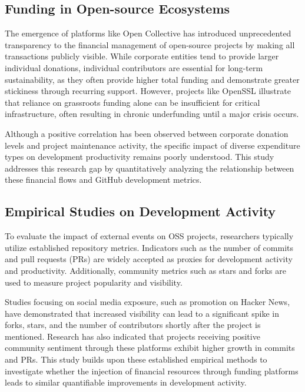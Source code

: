 \documentclass[11pt]{ist-thesis-lt}
\begin{document}
\subsection{Funding in Open-source Ecosystems}
The emergence of platforms like Open Collective has introduced unprecedented transparency to the financial management of open-source projects by making all transactions publicly visible. While corporate entities tend to provide larger individual donations, individual contributors are essential for long-term sustainability\cite{sample}, as they often provide higher total funding and demonstrate greater stickiness through recurring support\cite{sample}. However, projects like OpenSSL illustrate that reliance on grassroots funding alone can be insufficient for critical infrastructure, often resulting in chronic underfunding until a major crisis occurs.

Although a positive correlation has been observed between corporate donation levels and project maintenance activity, the specific impact of diverse expenditure types on development productivity remains poorly understood. This study addresses this research gap by quantitatively analyzing the relationship between these financial flows and GitHub development metrics.

\subsection{Empirical Studies on Development Activity}
To evaluate the impact of external events on OSS projects, researchers typically utilize established repository metrics. Indicators such as the number of commits and pull requests (PRs) are widely accepted as proxies for development activity and productivity. Additionally, community metrics such as stars and forks are used to measure project popularity and visibility.

Studies focusing on social media exposure, such as promotion on Hacker News, have demonstrated that increased visibility can lead to a significant spike in forks, stars, and the number of contributors shortly after the project is mentioned\cite{sample}. Research has also indicated that projects receiving positive community sentiment through these platforms exhibit higher growth in commits and PRs\cite{sample}. This study builds upon these established empirical methods to investigate whether the injection of financial resources through funding platforms leads to similar quantifiable improvements in development activity.
\end{document}
